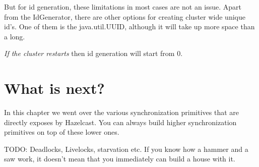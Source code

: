 But for id generation, these limitations in most cases are not an issue. Apart from the IdGenerator, there are other options for creating cluster wide unique id's. One of them is the java.util.UUID, although it will take up more space than a long. 

\emph{If the cluster restarts} then id generation will start from 0.

\section{What is next?}
In this chapter we went over the various synchronization primitives that are directly exposes by Hazelcast. You can always build higher synchronization primitives on top of these lower ones.

TODO: Deadlocks, Livelocks, starvation etc. If you know how a hammer and a saw work, it doesn't mean that you immediately can build a house with it.
